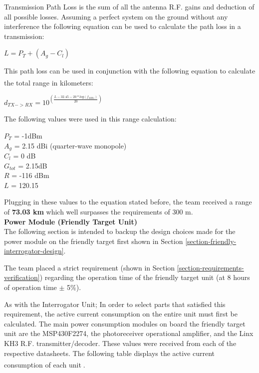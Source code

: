 \documentclass[letterpaper,10pt]{article}
\begin{document}
\begin{spacing}{1.15}
Transmission Path Loss is the sum of all the antenna R.F. gains and deduction of all possible losses. Assuming a perfect system on the ground without any interference the following equation can be used to calculate the path loss in a transmission:
\begin{center}
	$L = P_T + (A_g - C_l)$
\end{center}
This path loss can be used in conjunction with the following equation to calculate the total range in kilometers\textsuperscript{\cite{RFDistance}}:
\begin{center}
	\large
	$d_{TX->RX} = 10^{\left( \frac{L - 32.45 -20*log(f_{MHz})}{20}\right)}$
\end{center}
The following values were used in this range calculation:
\begin{center}
$P_T$ = -1dBm \\
$A_g$ = 2.15 dBi (quarter-wave monopole) \\
$C_l$ = 0 dB \\ 
$G_{tot}$ =  2.15dB\\
$R$ = -116 dBm \\
$L$ =  120.15\\
\end{center}
Plugging in these values to the equation stated before, the team received a range of \textbf{73.03 km} which well surpasses the requirements of 300 m. \\

\normalsize\textbf{Power Module (Friendly Target Unit)} \\
The following section is intended to backup the design choices made for the power module on the friendly target first shown in Section \ref{section-friendly-interrogator-design}.

The team placed a strict requirement (shown in Section \ref{section-requirements-verification}) regarding the operation time of the friendly target unit (at 8 hours of operation time $\pm$ 5\%).

As with the Interrogator Unit; In order to select parts that satisfied this requirement, the active current consumption on the entire unit must first be calculated. The main power consumption modules on board the friendly target unit are the MSP430F2274, the photoreceiver operational amplifier, and the Linx KH3 R.F. transmitter/decoder. These values were received from each of the respective datasheets. The following table displays the active current consumption of each unit\textsuperscript{\cite{MSP430F2274} \cite{Linx-Receiver} \cite{Laser}}. 



\end{spacing}
\end{document}

